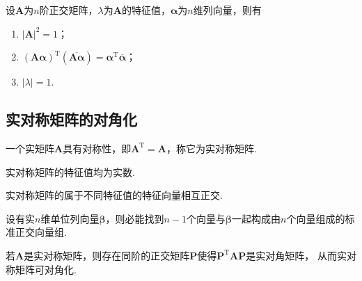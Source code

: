 \begin{theorem}
    设$\boldsymbol{A}$为$n$阶正交矩阵，$\lambda$为$\boldsymbol{A}$的特征值，$\boldsymbol{\alpha}$为$n$维列向量，则有
    \begin{enumerate}[(1)]
        \item ${|\boldsymbol{A}|}^2=1$；
        \item $(\boldsymbol{A}\boldsymbol{\alpha})^\mathrm{T}(\overline{\boldsymbol{A}\boldsymbol{\alpha}})=\boldsymbol{\alpha}^\mathrm{T}\overline{\boldsymbol{\alpha}}$；
        \item $|\lambda|=1$.
    \end{enumerate}
\end{theorem}

\subsection{实对称矩阵的对角化}
\begin{definition}[实对称矩阵]
    一个实矩阵$\boldsymbol{A}$具有对称性，即$\boldsymbol{A}^\mathrm{T}=\boldsymbol{A}$，称它为{\heiti 实对称矩阵}.
\end{definition}

\begin{theorem}
    实对称矩阵的特征值均为实数.
\end{theorem}

\begin{theorem}
    实对称矩阵的属于不同特征值的特征向量相互正交.
\end{theorem}

\begin{theorem}
    设有实$n$维单位列向量$\boldsymbol{\beta}$，则必能找到$n-1$个向量与$\boldsymbol{\beta}$一起构成由$n$个向量组成的标准正交向量组.
\end{theorem}

\begin{theorem}
    若$\boldsymbol{A}$是实对称矩阵，则存在同阶的正交矩阵$\boldsymbol{P}$使得$\boldsymbol{P}^\mathrm{T}\boldsymbol{A}\boldsymbol{P}$是实对角矩阵，
    从而实对称矩阵可对角化.
\end{theorem}